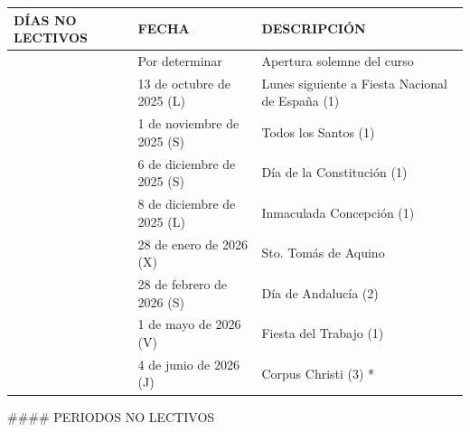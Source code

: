 \documentclass{article}
\begin{document}
\begin{itemize}
\begin{itemize}
\begin{scriptsize}
                  \vspace{0.4cm}
                  \begin{table}[h!]\centering\renewcommand{\arraystretch}{1.3}
                    \begin{tabular}{|p{}|p{}|p{}|}\hline
                      DÍAS NO LECTIVOS & FECHA                      & DESCRIPCIÓN                                     \\\hline
                                       & Por determinar             & Apertura solemne del curso                      \\\hline
                                       & 13 de octubre de 2025 (L)  & Lunes siguiente a Fiesta Nacional de España (1) \\\hline
                                       & 1 de noviembre de 2025 (S) & Todos los Santos (1)                            \\\hline
                                       & 6 de diciembre de 2025 (S) & Día de la Constitución (1)                      \\\hline
                                       & 8 de diciembre de 2025 (L) & Inmaculada Concepción (1)                       \\\hline
                                       & 28 de enero de 2026 (X)    & Sto. Tomás de Aquino                            \\\hline
                                       & 28 de febrero de 2026 (S)  & Día de Andalucía (2)                            \\\hline
                                       & 1 de mayo de 2026 (V)      & Fiesta del Trabajo (1)                          \\\hline
                                       & 4 de junio de 2026 (J)     & Corpus Christi (3) *                            \\\hline
                    \end{tabular}\end{table}
                  \vspace{0.4cm}

                  \#\#\#\# PERIODOS NO LECTIVOS


\end{scriptsize}
\end{itemize}
\end{itemize}
\end{document}
